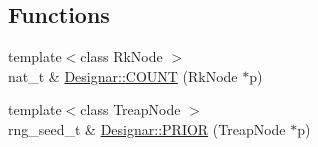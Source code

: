 \subsection*{Functions}
\begin{DoxyCompactItemize}
\item 
{\footnotesize template$<$class Rk\+Node $>$ }\\nat\+\_\+t \& \hyperlink{namespace_designar_a473e1d283b3fd0a75ec0c645eeb7818d}{Designar\+::\+C\+O\+U\+NT} (Rk\+Node $\ast$p)
\item 
{\footnotesize template$<$class Treap\+Node $>$ }\\rng\+\_\+seed\+\_\+t \& \hyperlink{namespace_designar_a0189c4d8fbe8db0c8189d80989a4e9ca}{Designar\+::\+P\+R\+I\+OR} (Treap\+Node $\ast$p)
\end{DoxyCompactItemize}
